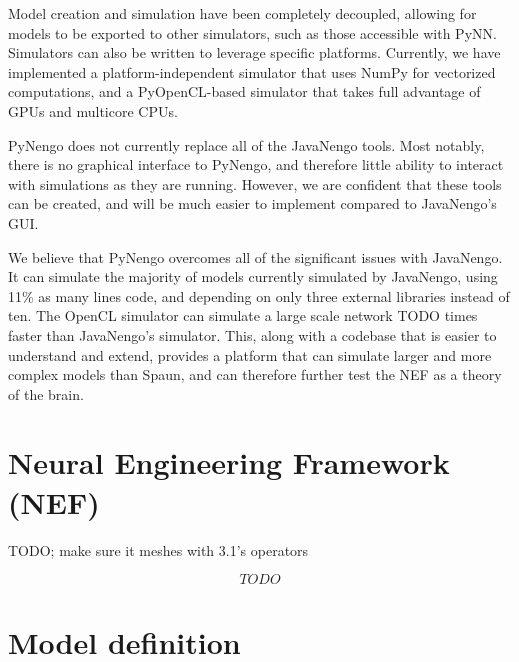 \documentclass{frontiersSCNS}
\begin{document}
Model creation and simulation
have been completely decoupled,
allowing for models to be exported
to other simulators,
such as those accessible with PyNN.
Simulators can also be written
to leverage specific platforms.
Currently, we have implemented
a platform-independent simulator
that uses NumPy for vectorized computations,
and a PyOpenCL-based
simulator that takes full advantage of GPUs
and multicore CPUs.

PyNengo does not currently
replace all of the JavaNengo tools.
Most notably, there is no graphical interface
to PyNengo, and therefore little ability to interact
with simulations as they are running.
However, we are confident that these tools
can be created, and will be much easier
to implement compared to JavaNengo's GUI.

We believe that PyNengo overcomes
all of the significant issues
with JavaNengo.
It can simulate the majority of models
currently simulated by JavaNengo,
using 11\% as many lines code,
and depending on
only three external libraries instead of ten.
The OpenCL simulator can simulate
a large scale network TODO times
faster than JavaNengo's simulator.
This, along with a codebase
that is easier to understand and extend,
provides a platform
that can simulate larger and more complex
models than Spaun,
and can therefore further
test the NEF as a theory of the brain.

\section{Neural Engineering Framework (NEF)}

TODO; make sure it meshes with 3.1's operators

\begin{equation} \label{TODO}
  TODO
\end{equation}




\section{Model definition}
\end{document}
